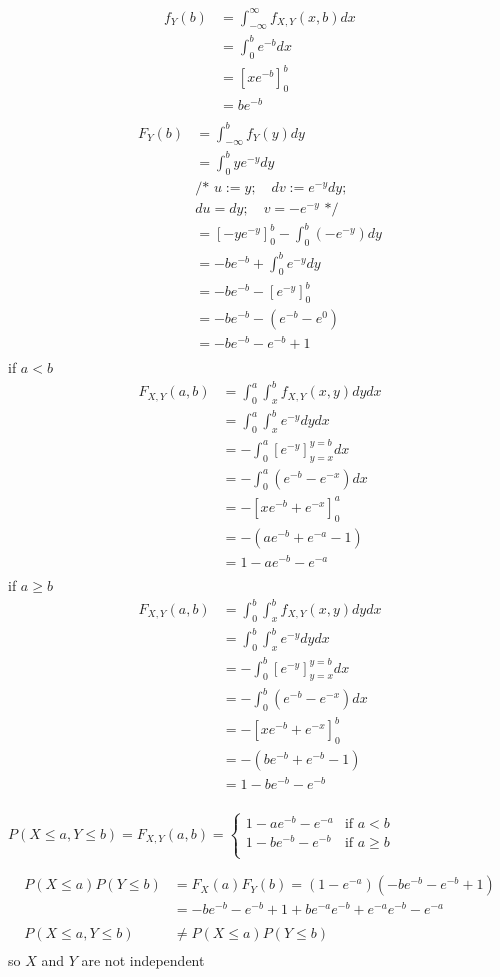 \documentclass[12pt,border=4pt,multi]{article} %
\begin{document}
\begin{align*}
f_Y(b) &= \int_{-\infty}^{\infty} f_{X, Y}(x, b)dx\\ 
&= \int_{0}^{b} e^{-b} dx\\
&= [xe^{-b}]_0^{b}\\
&= be^{-b}\\
\end{align*}
\begin{align*}
F_Y(b) &= \int_{-\infty}^{b} f_Y(y) dy\\
&= \int_{0}^{b} ye^{-y} dy\\
&\text{/* } u:= y;\quad dv := e^{-y}dy;\\
&du = dy;\quad v = -e^{-y}\text{ */}\\
&= [-ye^{-y}]_0^b - \int_0^b (-e^{-y}) dy\\
&= -be^{-b} + \int_0^b e^{-y} dy\\
&= -be^{-b} - [e^{-y}]_0^b\\
&= -be^{-b} - (e^{-b} - e^{0})\\
&= -be^{-b} - e^{-b} + 1\\
\end{align*}
if $a < b$
\begin{align*}
F_{X, Y}(a, b) &= \int_{0}^{a} \int_{x}^b f_{X, Y}(x, y) dy dx\\
&= \int_{0}^{a} \int_{x}^b e^{-y} dy dx\\
&= -\int_{0}^{a} [e^{-y}]_{y = x}^{y = b} dx\\
&= -\int_{0}^{a} (e^{-b} - e^{-x}) dx\\
&= -[xe^{-b} + e^{-x}]_0^a\\
&= -(ae^{-b} + e^{-a} - 1)\\
&= 1 - ae^{-b} - e^{-a}\\
\end{align*}
if $a \geq b$
\begin{align*}
F_{X, Y}(a, b) &= \int_{0}^{b} \int_{x}^b f_{X, Y}(x, y) dy dx\\
&= \int_{0}^{b} \int_{x}^b e^{-y} dy dx\\
&= -\int_{0}^{b} [e^{-y}]_{y = x}^{y = b} dx\\
&= -\int_{0}^{b} (e^{-b} - e^{-x}) dx\\
&= -[xe^{-b} + e^{-x}]_0^b\\
&= -(be^{-b} + e^{-b} - 1)\\
&= 1 - be^{-b} - e^{-b}\\
\end{align*}
\begin{center}
$P(X \leq a, Y \leq b) =
F_{X, Y}(a, b) =
\begin{cases}
1 - ae^{-b} - e^{-a} & \text{if } a < b\\
1 - be^{-b} - e^{-b} & \text{if } a \geq b\\
\end{cases}$
\end{center}
\begin{align*}
P(X \leq a)P(Y \leq b) &= F_X(a)F_Y(b) = (1 - e^{-a})(-be^{-b} - e^{-b} + 1)\\
&= -be^{-b} - e^{-b} + 1 + be^{-a}e^{-b} + e^{-a}e^{-b} - e^{-a}\\
\\
P(X \leq a, Y \leq b) &\not= P(X \leq a)P(Y \leq b)\\
\end{align*}
so $X$ and $Y$ are not independent\\
\end{document}
